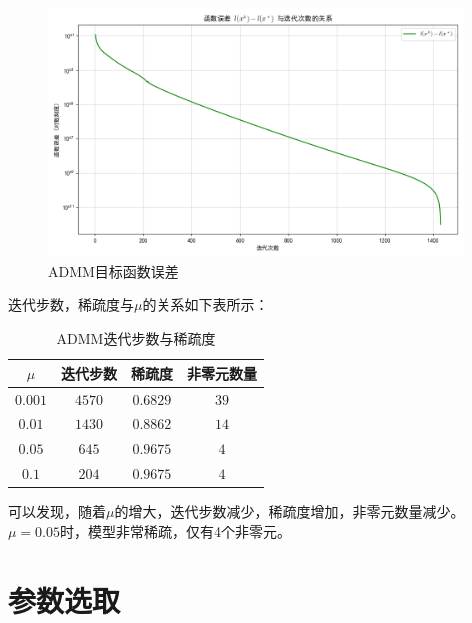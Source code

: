 \documentclass[cn,hazy,black,11pt,normal]{elegantnote}
\begin{document}
        \begin{figure}[H]
            \centering
            \includegraphics[width=0.98\textwidth]{image/function_error_cn}
            \caption{ADMM目标函数误差}
            \label{fig:function_error}
        \end{figure}

        迭代步数，稀疏度与$\mu$的关系如下表所示：

        \begin{table}[H]
            \centering
            \begin{tabular}{|c|c|c|c|}
                \hline
                $\mu$ & 迭代步数 & 稀疏度 & 非零元数量 \\
                \hline
                $0.001$ & $4570$ & $0.6829$ & $39$ \\
                $0.01$ & $1430$ & $0.8862$ & $14$ \\
                $0.05$ & $645$ & $0.9675$ & $4$ \\
                $0.1$ & $204$ & $0.9675$ & $4$ \\
                \hline
            \end{tabular}
            \caption{ADMM迭代步数与稀疏度}
            \label{tab:admm_iterations}
        \end{table}

        可以发现，随着$\mu$的增大，迭代步数减少，稀疏度增加，非零元数量减少。$\mu=0.05$时，模型非常稀疏，仅有4个非零元。

    \section{参数选取}
\end{document}

